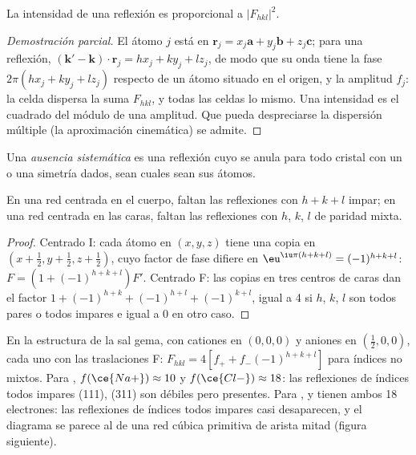 \begin{proposition}[Intensidad]\label{prop:b3:x-ray-diffraction:intensity}
La intensidad de una reflexión es proporcional a $|F_{hkl}|^2$.
\end{proposition}

\begin{proof}[Demostración parcial]
El átomo $j$ está en $\mathbf r_j = x_j\mathbf a + y_j\mathbf b + z_j\mathbf c$; para una reflexión,
$(\mathbf k' - \mathbf k)\cdot\mathbf r_j = hx_j + ky_j + lz_j$, de modo que su onda tiene la fase
$2\pi(hx_j + ky_j + lz_j)$ respecto de un átomo situado en el origen, y la amplitud $f_j$:
la celda dispersa la suma $F_{hkl}$, y todas las celdas lo mismo. Una intensidad es el
cuadrado del módulo de una amplitud. Que pueda despreciarse la dispersión múltiple
(la aproximación cinemática) se admite.
\end{proof}

\begin{definition}\label{def:b3:x-ray-diffraction:absence}
Una \emph{ausencia sistemática} es una reflexión cuyo
 se anula para todo cristal con un  o una
simetría dados, sean cuales sean sus átomos.
\end{definition}

\begin{proposition}\label{prop:b3:x-ray-diffraction:absences}
En una red centrada en el cuerpo, faltan las reflexiones con $h + k + l$ impar; en una
red centrada en las caras, faltan las reflexiones con $h$, $k$, $l$ de paridad mixta.
\end{proposition}

\begin{proof}
Centrado I: cada átomo en $(x,y,z)$ tiene una copia en $(x + \frac12, y + \frac12, z + \frac12)$,
cuyo factor de fase difiere en $\eu^{\iu\pi(h+k+l)} = (-1)^{h+k+l}$: $F = (1 +
(-1)^{h+k+l})F'$. Centrado F: las copias en tres centros de caras dan el factor $1 +
(-1)^{h+k} + (-1)^{h+l} + (-1)^{k+l}$, igual a 4 si $h$, $k$, $l$ son todos pares o todos impares
e igual a 0 en otro caso.
\end{proof}

\begin{example}\label{ex:b3:x-ray-diffraction:nacl-kcl}
En la estructura de la sal gema, con cationes en $(0,0,0)$ y aniones en $(\frac12,0,0)$, cada uno
con las traslaciones F: $F_{hkl} = 4[f_+ + f_-(-1)^{h+k+l}]$ para índices no mixtos.
Para , $f(\ce{Na+}) \approx 10$ y $f(\ce{Cl-}) \approx 18$: las reflexiones de índices todos impares
(111), (311) son débiles pero presentes. Para ,  y  tienen ambos 18
electrones: las reflexiones de índices todos impares casi desaparecen, y el diagrama se parece al
de una red cúbica primitiva de arista mitad (figura siguiente).
\end{example}


